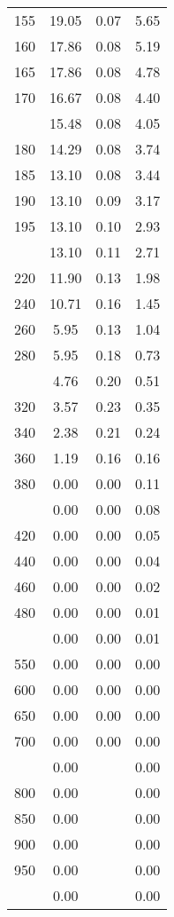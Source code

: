 \begin{table}[ht]
\begin{tabular}{lccc}
  155 & 19.05 & 0.07 & 5.65 \\ 
  160 & 17.86 & 0.08 & 5.19 \\ 
  165 & 17.86 & 0.08 & 4.78 \\ 
  170 & 16.67 & 0.08 & 4.40 \\ 
   \addlinespace
175 & 15.48 & 0.08 & 4.05 \\ 
  180 & 14.29 & 0.08 & 3.74 \\ 
  185 & 13.10 & 0.08 & 3.44 \\ 
  190 & 13.10 & 0.09 & 3.17 \\ 
  195 & 13.10 & 0.10 & 2.93 \\ 
   \addlinespace
200 & 13.10 & 0.11 & 2.71 \\ 
  220 & 11.90 & 0.13 & 1.98 \\ 
  240 & 10.71 & 0.16 & 1.45 \\ 
  260 & 5.95 & 0.13 & 1.04 \\ 
  280 & 5.95 & 0.18 & 0.73 \\ 
   \addlinespace
300 & 4.76 & 0.20 & 0.51 \\ 
  320 & 3.57 & 0.23 & 0.35 \\ 
  340 & 2.38 & 0.21 & 0.24 \\ 
  360 & 1.19 & 0.16 & 0.16 \\ 
  380 & 0.00 & 0.00 & 0.11 \\ 
   \addlinespace
400 & 0.00 & 0.00 & 0.08 \\ 
  420 & 0.00 & 0.00 & 0.05 \\ 
  440 & 0.00 & 0.00 & 0.04 \\ 
  460 & 0.00 & 0.00 & 0.02 \\ 
  480 & 0.00 & 0.00 & 0.01 \\ 
   \addlinespace
500 & 0.00 & 0.00 & 0.01 \\ 
  550 & 0.00 & 0.00 & 0.00 \\ 
  600 & 0.00 & 0.00 & 0.00 \\ 
  650 & 0.00 & 0.00 & 0.00 \\ 
  700 & 0.00 & 0.00 & 0.00 \\ 
   \addlinespace
750 & 0.00 &  & 0.00 \\ 
  800 & 0.00 &  & 0.00 \\ 
  850 & 0.00 &  & 0.00 \\ 
  900 & 0.00 &  & 0.00 \\ 
  950 & 0.00 &  & 0.00 \\ 
   \addlinespace
1000 & 0.00 &  & 0.00 \\ 
   \bottomrule
\end{tabular}
\end{table}
